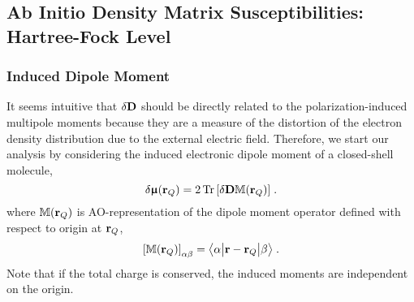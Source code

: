 \documentclass[aip,graphicx]{revtex4-1}
\newcommand{\tbraket}[3]{\ensuremath{\bigl\langle {#1} \bigl\lvert {#2} \bigl\lvert {#3} \bigr\rangle}}
\newcommand{\BM}[1]{\bm{#1}}
\DeclareMathOperator{\Tr}{Tr}
\begin{document}
\subsection{Ab Initio Density Matrix Susceptibilities: Hartree-Fock Level}

\subsubsection{Induced Dipole Moment}

It seems intuitive that $\delta {\bf D}$ should 
be directly related to the
polarization\hyp{}induced multipole moments because they are
a measure of the distortion of the electron density distribution due to the external electric
field. 
Therefore, 
we start our analysis by considering the induced electronic dipole moment 
of a closed-shell molecule, %
%
\begin{equation} \label{e:dmu-exact}
 \delta {\BM{\upmu}}({\bf r}_Q) = 
     2 \Tr{ 
         \left[ 
              \delta {\bf D} {\mathbb{M}({\bf r}_Q)}
         \right] } \;.
\end{equation}
%
where ${\mathbb{M}({\bf r}_Q)}$ is AO\hyp{}representation
of the dipole moment operator defined with respect to origin at ${\bf r}_Q$,
%
\begin{equation}\label{e:m}
 \left[ {\mathbb{M}({\bf r}_Q)} \right]_{\alpha\beta} = \tbraket{\alpha}{{\bf r} - {\bf r}_Q}{\beta} \;.
\end{equation}
%
Note that if the total charge is conserved, the induced moments are independent on the origin.
\end{document}
